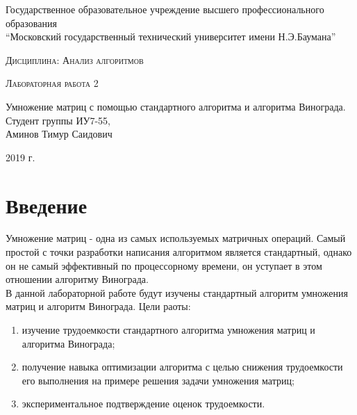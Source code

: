 \documentclass[a4paper, 14pt]{article}
\begin{document}
    \begin{titlepage}

        \begin{center}
            \large
            Государственное образовательное учреждение высшего профессионального образования\\
            “Московский государственный технический университет имени Н.Э.Баумана”
            \vspace{3cm}
            
            \textsc{Дисциплина: Анализ алгоритмов}
            \vspace{0.5cm}
                
            \textsc{Лабораторная работа 2}
            \vspace{1.5cm}
            
            {\LARGE Умножение матриц с помощью стандартного алгоритма и алгоритма Винограда.\\}
            \vspace{1.5cm}
            Студент группы ИУ7-55,\\   
            Аминов Тимур Саидович
            \vfill
            
            2019 г.
            
            \end{center}

    \end{titlepage}
    \setcounter{page}{2}
\tableofcontents
	
	\newpage
	
        \section*{Введение}
        
        
        \parindent=1cm
        Умножение матриц - одна из самых используемых матричных операций. Самый простой с точки разработки написания алгоритмом является стандартный, однако он не самый  эффективный по процессорному времени, он уступает в этом отношении алгоритму Винограда.\\
		В данной лабораторной работе будут изучены стандартный алгоритм умножения матриц и алгоритм Винограда.
        Цели раоты:
		\begin{enumerate}
		\item изучение трудоемкости стандартного алгоритма умножения матриц и алгоритма Винограда;
		\item получение навыка оптимизации алгоритма с целью снижения трудоемкости его выполнения на примере решения задачи умножения матриц;
		\item экспериментальное подтверждение оценок трудоемкости.
		\end{enumerate}
        
\end{document}

